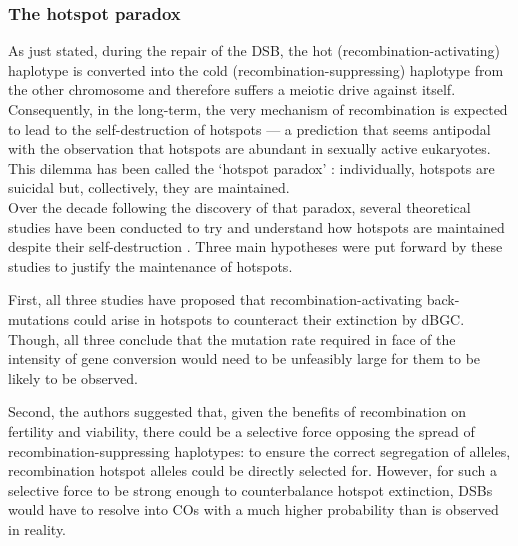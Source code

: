 \subsubsection{The hotspot paradox}


As just stated, during the repair of the DSB, the hot (recombination-activating) haplotype is converted into the cold (recombination-suppressing) haplotype from the other chromosome \citep{gutz1971site,schuchert1988ade6m26,jeffreys2009rise} and therefore suffers a meiotic drive against itself.
Consequently, in the long-term, the very mechanism of recombination is expected to lead to the self-destruction of hotspots — a prediction that seems antipodal with the observation that hotspots are abundant in sexually active eukaryotes.
This dilemma has been called the ‘hotspot paradox’ \citep{boulton1997hotspot}: individually, hotspots are suicidal but, collectively, they are maintained.\\

Over the decade following the discovery of that paradox, several theoretical studies have been conducted to try and understand how hotspots are maintained despite their self-destruction \citep{boulton1997hotspot,pineda-krch2005persistence,coop2007live}.
Three main hypotheses were put forward by these studies to justify the maintenance of hotspots.

First, all three studies have proposed that recombination-activating back-mutations could arise in hotspots to counteract their extinction by dBGC\@. Though, all three conclude that the mutation rate required in face of the intensity of gene conversion would need to be unfeasibly large for them to be likely to be observed.

Second, the authors suggested that, given the benefits of recombination on fertility and viability, there could be a selective force opposing the spread of recombination-suppressing haplotypes: to ensure the correct segregation of alleles, recombination hotspot alleles could be directly selected for. However, for such a selective force to be strong enough to counterbalance hotspot extinction, DSBs would have to resolve into COs with a much higher probability than is observed in reality.

